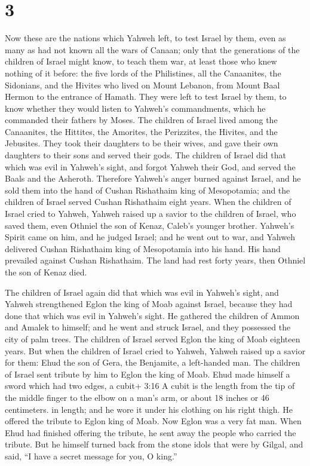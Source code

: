 \hypertarget{section-2}{%
\section{3}\label{section-2}}

 Now these are the nations which Yahweh left, to test Israel
by them, even as many as had not known all the wars of Canaan;
 only that the generations of the children of Israel might
know, to teach them war, at least those who knew nothing of it before:
 the five lords of the Philistines, all the Canaanites, the
Sidonians, and the Hivites who lived on Mount Lebanon, from Mount Baal
Hermon to the entrance of Hamath.  They were left to test
Israel by them, to know whether they would listen to Yahweh's
commandments, which he commanded their fathers by Moses. 
The children of Israel lived among the Canaanites, the Hittites, the
Amorites, the Perizzites, the Hivites, and the Jebusites. 
They took their daughters to be their wives, and gave their own
daughters to their sons and served their gods.  The children
of Israel did that which was evil in Yahweh's sight, and forgot Yahweh
their God, and served the Baals and the Asheroth.  Therefore
Yahweh's anger burned against Israel, and he sold them into the hand of
Cushan Rishathaim king of Mesopotamia; and the children of Israel served
Cushan Rishathaim eight years.  When the children of Israel
cried to Yahweh, Yahweh raised up a savior to the children of Israel,
who saved them, even Othniel the son of Kenaz, Caleb's younger brother.
 Yahweh's Spirit came on him, and he judged Israel; and he
went out to war, and Yahweh delivered Cushan Rishathaim king of
Mesopotamia into his hand. His hand prevailed against Cushan Rishathaim.
 The land had rest forty years, then Othniel the son of
Kenaz died.

 The children of Israel again did that which was evil in
Yahweh's sight, and Yahweh strengthened Eglon the king of Moab against
Israel, because they had done that which was evil in Yahweh's sight.
 He gathered the children of Ammon and Amalek to himself;
and he went and struck Israel, and they possessed the city of palm
trees.  The children of Israel served Eglon the king of
Moab eighteen years.  But when the children of Israel cried
to Yahweh, Yahweh raised up a savior for them: Ehud the son of Gera, the
Benjamite, a left-handed man. The children of Israel sent tribute by him
to Eglon the king of Moab.  Ehud made himself a sword which
had two edges, a cubit+ 3:16 A cubit is the length from the tip of the
middle finger to the elbow on a man's arm, or about 18 inches or 46
centimeters. in length; and he wore it under his clothing on his right
thigh.  He offered the tribute to Eglon king of Moab. Now
Eglon was a very fat man.  When Ehud had finished offering
the tribute, he sent away the people who carried the tribute.
 But he himself turned back from the stone idols that were
by Gilgal, and said, ``I have a secret message for you, O king.''

